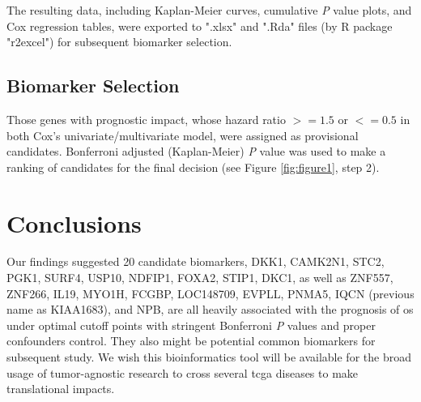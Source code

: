 \documentclass[jpm,article,submit,moreauthors,pdftex]{Definitions/mdpi}
\begin{document}
\begin{paracol}{2}
The resulting data, including Kaplan-Meier curves, cumulative \textit{P} value plots, and Cox regression tables, were exported to ".xlsx" and ".Rda" files (by R package "r2excel") for subsequent biomarker selection.


\subsection{Biomarker Selection}

Those genes with prognostic impact, whose hazard ratio $>=1.5$ or $<=0.5$ in both Cox's univariate/multivariate model, were assigned as provisional candidates.
Bonferroni adjusted (Kaplan-Meier) \textit{P} value was used to make a ranking of candidates for the final decision (see Figure \ref{fig:figure1}, step 2).

\section{Conclusions} %


Our findings suggested 20 candidate biomarkers, DKK1, CAMK2N1, STC2, PGK1, SURF4, USP10, NDFIP1, FOXA2, STIP1, DKC1, as well as ZNF557, ZNF266, IL19, MYO1H, FCGBP, LOC148709, EVPLL, PNMA5, IQCN (previous name as KIAA1683), and NPB, are all heavily associated with the prognosis of \acrshort{os} under optimal cutoff points with stringent Bonferroni \textit{P} values and proper confounders control. They also might be potential common biomarkers for subsequent study.
We wish this bioinformatics tool will be available for the broad usage of tumor-agnostic research\cite{Looney2020} to cross several \acrshort{tcga} diseases to make translational impacts. %



\vspace{6pt} 




\end{paracol}
\end{document}
